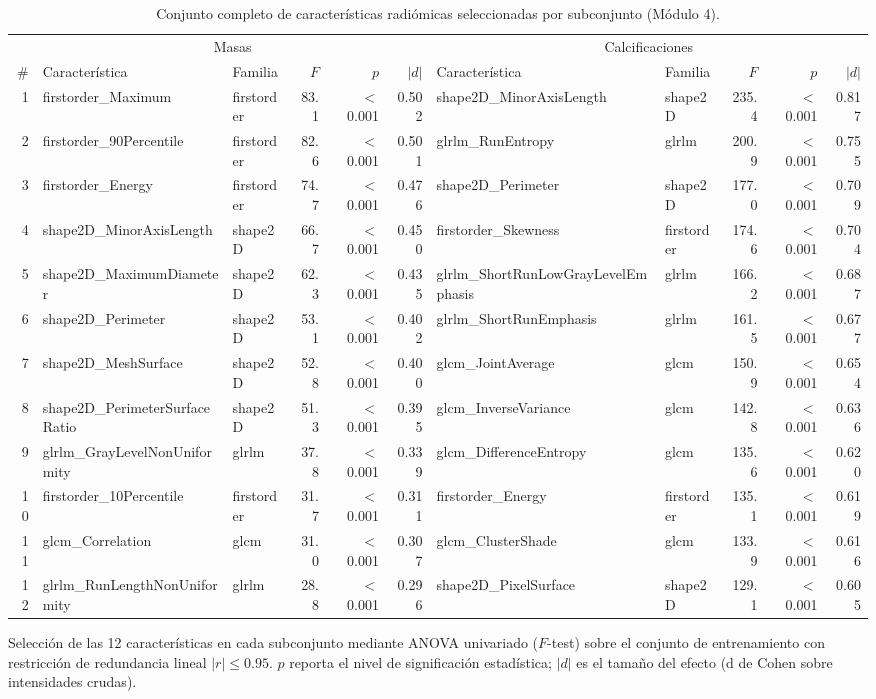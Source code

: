 \begin{table}[H]
\centering
\small
\caption{Conjunto completo de características radiómicas seleccionadas por subconjunto (Módulo 4).}
\label{tab:anexo_m4_seleccion}
\begin{adjustbox}{max width=\linewidth}
\begin{tabular}{r l l r r r l l r r r}
\toprule
 & \multicolumn{5}{c}{Masas} & \multicolumn{5}{c}{Calcificaciones} \\ \cmidrule(lr){2-6}\cmidrule(lr){7-11}
\# & Característica & Familia & $F$ & $p$ & $|d|$ & Característica & Familia & $F$ & $p$ & $|d|$ \\
\midrule
1 & firstorder\_Maximum & firstorder & 83.1 & $<$0.001 & 0.502 & shape2D\_MinorAxisLength & shape2D & 235.4 & $<$0.001 & 0.817 \\
2 & firstorder\_90Percentile & firstorder & 82.6 & $<$0.001 & 0.501 & glrlm\_RunEntropy & glrlm & 200.9 & $<$0.001 & 0.755 \\
3 & firstorder\_Energy & firstorder & 74.7 & $<$0.001 & 0.476 & shape2D\_Perimeter & shape2D & 177.0 & $<$0.001 & 0.709 \\
4 & shape2D\_MinorAxisLength & shape2D & 66.7 & $<$0.001 & 0.450 & firstorder\_Skewness & firstorder & 174.6 & $<$0.001 & 0.704 \\
5 & shape2D\_MaximumDiameter & shape2D & 62.3 & $<$0.001 & 0.435 & glrlm\_ShortRunLowGrayLevelEmphasis & glrlm & 166.2 & $<$0.001 & 0.687 \\
6 & shape2D\_Perimeter & shape2D & 53.1 & $<$0.001 & 0.402 & glrlm\_ShortRunEmphasis & glrlm & 161.5 & $<$0.001 & 0.677 \\
7 & shape2D\_MeshSurface & shape2D & 52.8 & $<$0.001 & 0.400 & glcm\_JointAverage & glcm & 150.9 & $<$0.001 & 0.654 \\
8 & shape2D\_PerimeterSurfaceRatio & shape2D & 51.3 & $<$0.001 & 0.395 & glcm\_InverseVariance & glcm & 142.8 & $<$0.001 & 0.636 \\
9 & glrlm\_GrayLevelNonUniformity & glrlm & 37.8 & $<$0.001 & 0.339 & glcm\_DifferenceEntropy & glcm & 135.6 & $<$0.001 & 0.620 \\
10 & firstorder\_10Percentile & firstorder & 31.7 & $<$0.001 & 0.311 & firstorder\_Energy & firstorder & 135.1 & $<$0.001 & 0.619 \\
11 & glcm\_Correlation & glcm & 31.0 & $<$0.001 & 0.307 & glcm\_ClusterShade & glcm & 133.9 & $<$0.001 & 0.616 \\
12 & glrlm\_RunLengthNonUniformity & glrlm & 28.8 & $<$0.001 & 0.296 & shape2D\_PixelSurface & shape2D & 129.1 & $<$0.001 & 0.605 \\
\bottomrule
\end{tabular}
\end{adjustbox}
\par\smallskip
\parbox{0.95\linewidth}{\footnotesize Selección de las 12 características en cada subconjunto mediante ANOVA univariado ($F$-test) sobre el conjunto de entrenamiento con restricción de redundancia lineal $|r| \le 0.95$. $p$ reporta el nivel de significación estadística; $|d|$ es el tamaño del efecto (d de Cohen sobre intensidades crudas).}
\end{table}
